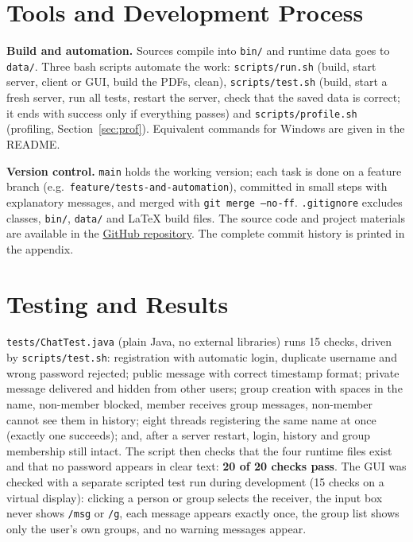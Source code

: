 \documentclass[conference]{IEEEtran}
\newcommand{\code}[1]{\texttt{#1}}
\begin{document}
\section{Tools and Development Process}
\textbf{Build and automation.} Sources compile into \code{bin/} and runtime data goes to \code{data/}. Three bash scripts automate the work:
\code{scripts/run.sh} (build, start server, client or GUI, build the PDFs, clean), \code{scripts/test.sh}
(build, start a fresh server, run all tests, restart the server, check that the saved data is correct; it ends with success only if everything passes)
and \code{scripts/profile.sh} (profiling, Section~\ref{sec:prof}). Equivalent commands for Windows are given in the README.

\textbf{Version control.} \code{main} holds the working version; each task is done on a feature branch (e.g.\ \code{feature/tests-and-automation}),
committed in small steps with explanatory messages, and merged with \code{git merge --no-ff}. \code{.gitignore} excludes classes, \code{bin/}, \code{data/}
and \LaTeX{} build files. The source code and project materials are available in the
\href{https://github.com/mwaghmode034-cell/SSL_ChatApp}{GitHub repository}. The complete commit history is printed in the appendix.

\section{Testing and Results}\label{sec:tests}
\code{tests/ChatTest.java} (plain Java, no external libraries) runs 15 checks, driven by \code{scripts/test.sh}:
registration with automatic login, duplicate username and wrong password rejected; public message with correct timestamp format;
private message delivered and hidden from other users; group creation with spaces in the name, non-member blocked, member receives group messages,
non-member cannot see them in history; eight threads registering the same name at once (exactly one succeeds); and, after a server restart, login,
history and group membership still intact. The script then checks that the four runtime files exist and that no password appears in clear text:
\textbf{20 of 20 checks pass}. The GUI was checked with a separate scripted test run during development (15 checks on a virtual display): clicking a person or group selects the receiver, the input box never shows \code{/msg} or \code{/g}, each message appears exactly once, the group list shows only the user's own groups, and no warning messages appear.
\end{document}
